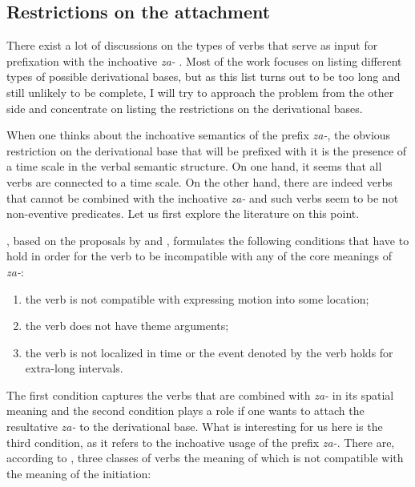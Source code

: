 \subsection{Restrictions on the attachment}
There exist a lot of discussions on the types of verbs that serve as input for prefixation with the inchoative \textit{za-} \citep{Isachenko:60, Zemskaja:55, Sheljakin:69, Zaliznjak:95, Braginsky:08}. Most of the work focuses on listing different types of possible derivational bases, but as this list turns out to be too long and still unlikely to be complete, I will try to approach the problem from the other side and concentrate on listing the restrictions on the derivational bases.

When one thinks about the inchoative semantics of the prefix \textit{za-}, the obvious restriction on the derivational base that will be prefixed with it is the presence of a time scale in the verbal semantic structure. On one hand, it seems that all verbs are connected to a time scale. On the other hand, there are indeed verbs that cannot be combined with the inchoative \textit{za-} and such verbs seem to be not non-eventive predicates. Let us first explore the literature on this point.

\citet[275]{Braginsky:08}, based on the proposals by \citet{Sheljakin:69} and \citet{Paducheva:96}, formulates the following conditions that have to hold in order for the verb to be incompatible with any of the core meanings of \textit{za-}:
\begin{enumerate}
\item the verb is not compatible with expressing motion into some location;
\item the verb does not have theme arguments;
\item the verb is not localized in time or the event denoted by the verb holds for extra-long intervals.
\end{enumerate}

The first condition captures the verbs that are combined with \textit{za-} in its spatial meaning and the second condition plays a role if one wants to attach the resultative \textit{za-} to the derivational base. What is interesting for us here is the third condition, as it refers to the inchoative usage of the prefix \textit{za-}. There are, according to \citet{Paducheva:96}, three classes of verbs the meaning of which is not compatible with the meaning of the initiation:

